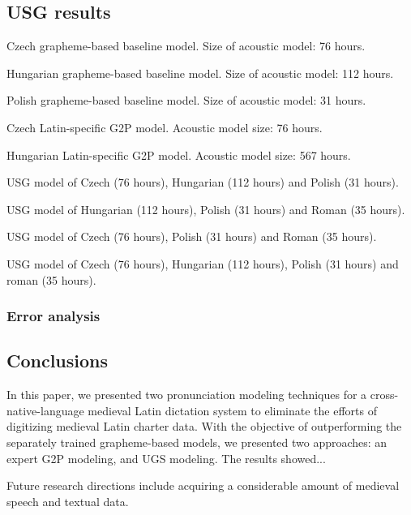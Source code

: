 \documentclass[runningheads,a4paper]{llncs}
\begin{document}
\subsection{USG results}
\begin{table}
\parbox{.45\linewidth}{
\centering
\caption{Czech grapheme-based baseline model. Size of acoustic model: 76 hours.}

}
\hfill
\parbox{.45\linewidth}{
\centering
\caption{Hungarian grapheme-based baseline model. Size of acoustic model: 112 hours.}

}
\hfill
\parbox{.45\linewidth}{
\centering
\caption{Polish grapheme-based baseline model. Size of acoustic model: 31 hours.}

}
\hfill
\parbox{.45\linewidth}{
\centering
\caption{Czech Latin-specific G2P model. Acoustic model size: 76 hours.}

}
\hfill
\parbox{.45\linewidth}{
\centering
\caption{Hungarian Latin-specific G2P model. Acoustic model size: 567 hours.}

}
\hfill
\parbox{.45\linewidth}{
\centering
\caption{USG model of Czech (76 hours), Hungarian (112 hours) and Polish (31 hours).}

}
\hfill
\parbox{.45\linewidth}{
\centering
\caption{USG model of Hungarian (112 hours), Polish (31 hours) and Roman (35 hours).}

}
\hfill
\parbox{.45\linewidth}{
\centering
\caption{USG model of Czech (76 hours), Polish (31 hours) and Roman (35 hours).}

}
\hfill
\parbox{.45\linewidth}{
\centering
\caption{USG model of Czech (76 hours), Hungarian (112 hours), Polish (31 hours) and roman (35 hours).}

}
\end{table}
\subsubsection{Error analysis}
\subsection{Conclusions}
In this paper, we presented two pronunciation modeling techniques for a cross-native-language medieval Latin dictation system to eliminate the efforts of digitizing medieval Latin charter data.
With the objective of outperforming the separately trained grapheme-based models, we presented two approaches: an expert G2P modeling, and UGS modeling.
The results showed...

Future research directions include acquiring a considerable amount of medieval speech and textual data.



\end{document}
